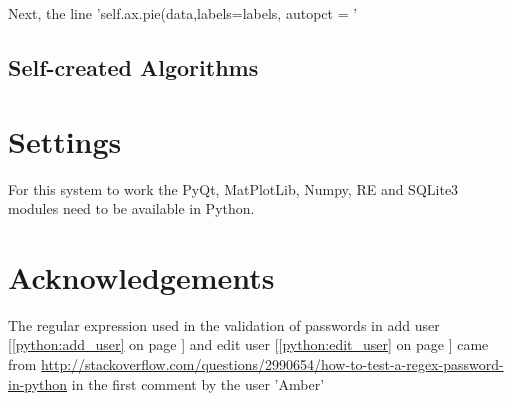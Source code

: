 Next, the line 'self.ax.pie(data,labels=labels, autopct = '%

\subsection{Self-created Algorithms}

\section{Settings}
For this system to work the PyQt, MatPlotLib, Numpy, RE and SQLite3 modules need to be available in Python.

\section{Acknowledgements}
The regular expression used in the validation of passwords in add user [\ref{python:add_user} on page \pageref{python:add_user}] and edit user [\ref{python:edit_user} on page \pageref{python:edit_user}] came from \url{http://stackoverflow.com/questions/2990654/how-to-test-a-regex-password-in-python} in the first comment by the user 'Amber'

